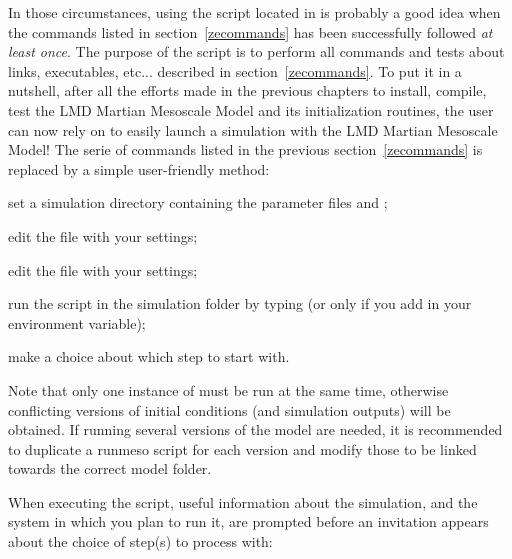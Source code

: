 \sk
In those circumstances, using the  script  located in  is probably a good idea when the commands listed in section~\ref{zecommands} has been successfully followed \emph{at least once}. The purpose of the  script is to perform all commands and tests about links, executables, etc... described in section~\ref{zecommands}. To put it in a nutshell, after all the efforts made in the previous chapters to install, compile, test the LMD Martian Mesoscale Model and its initialization routines, the user can now rely on  to easily launch a simulation with the LMD Martian Mesoscale Model! The serie of commands listed in the previous section~\ref{zecommands} is replaced by a simple user-friendly method:
\begin{citemize}
\item set a simulation directory containing the parameter files  and ;
\item edit the  file with your settings;
\item edit the  file with your settings;
\item run the  script in the simulation folder by typing  (or only  if you add  in your  environment variable);
\item make a choice about which step to start with.
\end{citemize}
Note that only one instance of  must be run at the same time, otherwise conflicting versions of initial conditions (and simulation outputs) will be obtained. If running several versions of the model are needed, it is recommended to duplicate a runmeso script for each version and modify those to be linked towards the correct model folder.

\sk
When executing the  script, useful information about the simulation, and the system in which you plan to run it, are prompted before an invitation appears about the choice of step(s) to process with:

\footnotesize
{}
\normalsize


